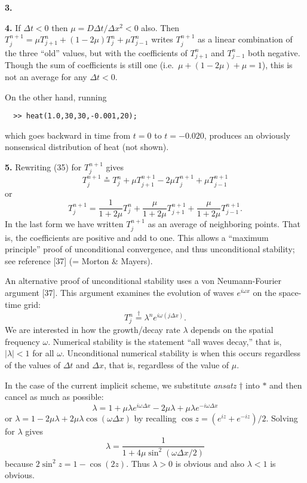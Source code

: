 \documentclass[10pt]{amsart}
\newcommand{\mfile}[1]{
\begin{quote}
\bigskip
\VerbatimInput[frame=single,label=\fbox{\normalsize \textsl{\,#1\,}},fontfamily=courier,fontsize=\footnotesize]{#1}
\end{quote}
}
\newcommand{\prob}[1]{\bigskip\noindent\large\textbf{#1.}\normalsize }
\begin{document}
\prob{3}

\mfile{heatwithloops.m}

\prob{4}  If $\Delta t < 0$ then $\mu = D \Delta t / \Delta x^2 < 0$ also.  Then $T_j^{n+1} = \mu T_{j+1}^n + (1 - 2 \mu) T_j^n + \mu T_{j-1}^n$ writes $T_j^{n+1}$ as a linear combination of the three ``old'' values, but with the coefficients of $T_{j+1}^n$ and $T_{j-1}^n$ both negative.  Though the sum of coefficients is still one (i.e.~$\mu + (1-2\mu) + \mu = 1$), this is not an average for any $\Delta t < 0$.

On the other hand, running
\begin{verbatim}
  >> heat(1.0,30,30,-0.001,20);
\end{verbatim}
which goes backward in time from $t=0$ to $t=-0.020$, produces an obviously nonsensical distribution of heat (not shown).

\prob{5}  Rewriting (35) for $T_j^{n+1}$ gives
    $$T_j^{n+1} \stackrel{\ast}{=} T_j^n + \mu T_{j+1}^{n+1} - 2 \mu T_j^{n+1} + \mu T_{j-1}^{n+1}$$
or
    $$T_j^{n+1} = \frac{1}{1 + 2\mu} T_j^n + \frac{\mu}{1 + 2\mu} T_{j+1}^{n+1} + \frac{\mu}{1 + 2\mu} T_{j-1}^{n+1}.$$
In the last form we have written $T_j^{n+1}$ as an average of neighboring points.  That is, the coefficients are positive and add to one.  This allows a ``maximum principle'' proof of unconditional convergence, and thus unconditional stability; see reference [37] (= Morton \& Mayers).

An alternative proof of unconditional stability uses a von Neumann-Fourier argument [37].  This argument examines the evolution of waves $e^{i\omega x}$ on the space-time grid:
    $$T_j^n \stackrel{\dagger}{=} \lambda^n e^{i\omega (j\Delta x)}.$$
We are interested in how the growth/decay rate $\lambda$ depends on the spatial frequency $\omega$.  Numerical stability is the statement ``all waves decay,'' that is, $|\lambda|<1$ for all $\omega$.  Unconditional numerical stability is when this occurs regardless of the values of $\Delta t$ and $\Delta x$, that is, regardless of the value of $\mu$.

In the case of the current implicit scheme, we substitute \emph{ansatz} $\dagger$ into $\ast$ and then cancel as much as possible:
    $$\lambda = 1 + \mu \lambda e^{i\omega\Delta x} - 2 \mu \lambda + \mu \lambda e^{-i\omega\Delta x}$$
or $\lambda = 1 - 2 \mu \lambda + 2 \mu \lambda \cos(\omega\Delta x)$ by recalling $\cos z = (e^{iz} + e^{-iz}) / 2$.  Solving for $\lambda$ gives
    $$\lambda = \frac{1}{1 + 4 \mu \sin^2(\omega\Delta x/2)}$$
because $2 \sin^2 z = 1-\cos(2z)$.  Thus $\lambda > 0$ is obvious and also $\lambda < 1$ is obvious.
\end{document}
